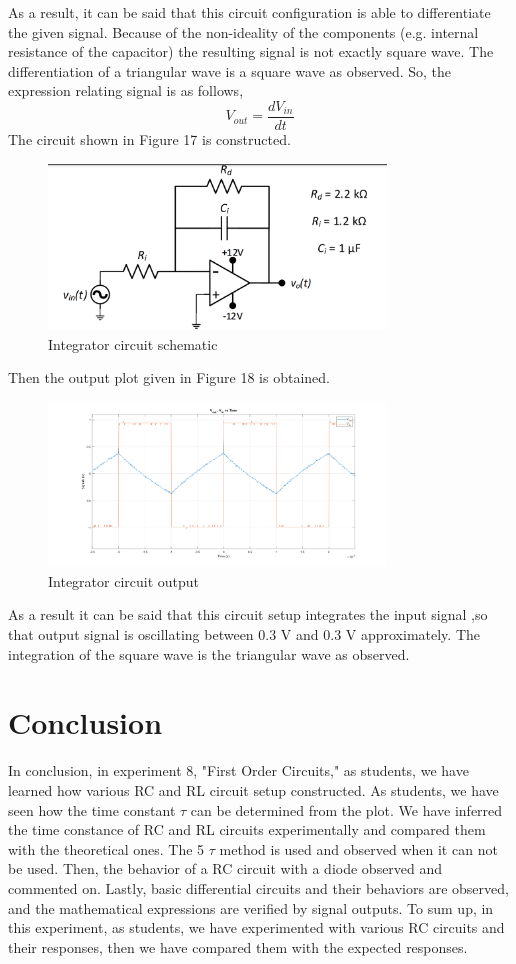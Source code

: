 \documentclass[letterpaper,12pt]{article}
\begin{document}
As a result, it can be said that this circuit configuration is able to differentiate the given signal. Because of the non-ideality of the components (e.g. internal resistance of the capacitor) the resulting signal is not exactly square wave.  The differentiation of a triangular wave is a square wave as observed. So, the expression relating signal is as follows,
\[V_{out} = \frac{dV_{in}}{dt}\]
\newline
The circuit shown in Figure 17 is constructed.
\begin{figure}[H]
	\centering
   \includegraphics[width=0.8\textwidth]{integrator.png}
   \caption{Integrator circuit schematic}
\end{figure} 
Then the output plot given in Figure 18 is obtained.
\begin{figure}[H]
	\centering
   \includegraphics[width=0.8\textwidth]{3.png}
   \caption{Integrator circuit output}
\end{figure} 
As a result it can be said that this circuit setup integrates the input signal ,so that output signal is oscillating between 0.3 V and 0.3 V approximately. The integration of the square wave is the triangular wave as observed.
\section{Conclusion}

In conclusion, in experiment 8, "First Order Circuits," as students, we have learned how various RC and RL circuit setup constructed. As students, we have seen how the time constant \(\tau\) can be determined from the plot. We have inferred the time constance of RC and RL circuits experimentally and compared them with the theoretical ones. The 5 \(\tau\) method is used and observed when it can not be used. Then, the behavior of a RC circuit with a diode observed and commented on.  Lastly, basic differential circuits and their behaviors are observed, and the mathematical expressions are verified by signal outputs. To sum up, in this experiment, as students, we have experimented with various RC circuits and their responses, then we have compared them with the expected responses. 
\end{document}
